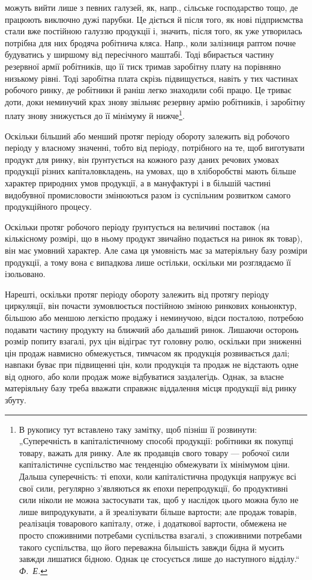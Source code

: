 \parcont{}  %
можуть вийти лише з певних галузей, як, напр., сільське господарство тощо,
де працюють виключно дужі парубки. Це діється й після того, як нові підприємства
стали вже постійною галуззю продукції і, значить, після того,
як уже утворилась потрібна для них бродяча робітнича кляса. Напр.,
коли залізниця раптом почне будуватись у ширшому від пересічного
маштабі. Тоді вбирається частину резервної армії робітників, що її тиск
тримав заробітну плату на порівняно низькому рівні. Тоді заробітна плата
скрізь підвищується, навіть у тих частинах робочого ринку, де робітники
й раніш легко знаходили собі працю. Це триває доти, доки неминучий
крах знову звільняє резервну армію робітників, і заробітну плату
знову знижується до її мінімуму й нижче\footnote{
В рукопису тут вставлено таку замітку, щоб пізніш її розвинути: „Суперечність
в капіталістичному способі продукції: робітники як покупці товару,
важать для ринку. Але як продавців свого товару — робочої сили капіталістичне
суспільство має тенденцію обмежувати їх мінімумом ціни. Дальша суперечність:
ті епохи, коли капіталістична продукція напружує всі свої сили, регулярно з’являються
як епохи перепродукції, бо продуктивні сили ніколи не можна застосувати
так, щоб у наслідок цього можна було не лише випродукувати, а й зреалізувати
більше вартости; але продаж товарів, реалізація товарового капіталу, отже,
і додаткової вартости, обмежена не просто споживними потребами суспільства
взагалі, з споживними потребами такого суспільства, що його переважна
більшість завжди бідна й мусить завжди лишатися бідною. Однак це стосується
лише до наступного відділу.“ \emph{Ф.~Е.}
}.

Оскільки більший або менший протяг періоду обороту залежить від
робочого періоду у власному значенні, тобто від періоду, потрібного на
те, щоб виготувати продукт для ринку, він ґрунтується на кожного
разу даних речових умовах продукції різних капіталовкладень, на
умовах, що в хліборобстві мають більше характер природних умов продукції,
а в мануфактурі і в більшій частині видобувної промисловости
змінюються разом із суспільним розвитком самого продукційного процесу.

Оскільки протяг робочого періоду ґрунтується на величині поставок
(на кількісному розмірі, що в ньому продукт звичайно подається на ринок
як товар), він має умовний характер. Але сама ця умовність має за
матеріяльну базу розміри продукції, а тому вона є випадкова лише остільки,
оскільки ми розглядаємо її ізольовано.

Нарешті, оскільки протяг періоду обороту залежить від протягу періоду
циркуляції, він почасти зумовлюється постійною зміною ринкових
коньюнктур, більшою або меншою легкістю продажу і неминучою, відси
посталою, потребою подавати частину продукту на ближчий або дальший
ринок. Лишаючи осторонь розмір попиту взагалі, рух цін відіграє
тут головну ролю, оскільки при зниженні цін продаж навмисно обмежується,
тимчасом як продукція розвивається далі; навпаки буває при
підвищенні цін, коли продукція та продаж не відстають одне від одного,
або коли продаж може відбуватися заздалегідь. Однак, за власне матеріяльну
базу треба вважати справжнє віддалення місця продукції від
ринку збуту.
